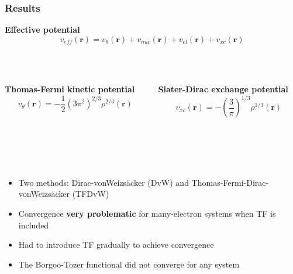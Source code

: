 \documentclass[mathserif, 8pt]{beamer}
\begin{document}
\begin{frame}
    \frametitle{Results}
    \centering
    \textbf{Effective potential}
    \begin{equation}
	\nonumber
	v_{eff}(\boldsymbol{r}) = v_\theta(\boldsymbol{r}) + v_{nuc}(\boldsymbol{r}) + 
	v_{el}(\boldsymbol{r}) + v_{xc}(\boldsymbol{r})
    \end{equation}
    \ \\
    \ \\
    \begin{columns}
    \begin{column}{.5\textwidth}
    \centering
    \textbf{Thomas-Fermi kinetic potential}
    \begin{equation}
        \nonumber
	v_\theta(\boldsymbol{r})= -\frac{1}{2}\left(3\pi^2\right)^{2/3} \rho^{2/3}(\boldsymbol{r})
    \end{equation}
    \end{column}
    \begin{column}{.5\textwidth}
    \centering
    \textbf{Slater-Dirac exchange potential}
    \begin{equation}
        \nonumber
	v_{xc}(\boldsymbol{r}) = -\left(\frac{3}{\pi}\right)^{1/3} \rho^{1/3}(\boldsymbol{r})
    \end{equation}
    \end{column}
    \end{columns}
    \ \\
    \ \\
    \ \\
    \begin{itemize}
	\item	Two methods: Dirac-vonWeizs\"{a}cker (DvW) and Thomas-Fermi-Dirac-vonWeizs\"{a}cker (TFDvW)
	\item	Convergence \textbf{very problematic} for many-electron systems when TF is included
	\item	Had to introduce TF gradually to achieve convergence
	\item	The Borgoo-Tozer functional did not converge for any system
    \end{itemize}
    \ \\
    \ \\
    \ \\
    \ \\
    \ \\
    \ \\
    \ \\
    \ \\
    \ \\
    \ \\
    \ \\
    \ \\
    \ \\
    \ \\
\end{frame}
\end{document}

